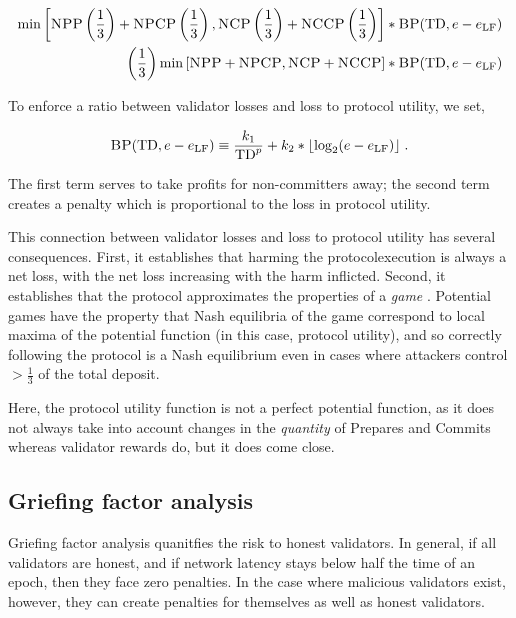\documentclass[12pt, final]{article}
\newcommand{\epoch}{\ensuremath{e}\xspace}
\newcommand{\BP}{\textsc{BP}\xspace}
\newcommand{\NCP}{\textsc{NCP}\xspace}
\newcommand{\NCCP}{\textsc{NCCP}\xspace}
\newcommand{\NPP}{\textsc{NPP}\xspace}
\newcommand{\NPCP}{\textsc{NPCP}\xspace}
\newcommand{\totaldeposit}{\textnormal{TD}\xspace}
\newcommand{\epochLF}{\ensuremath{\epoch_{\textnormal{LF}}}\xspace}
\begin{document}
\begin{equation}
\begin{split}
\min \left[ \NPP \left(\frac{1}{3}\right) + \NPCP\left(\frac{1}{3}\right), \NCP \left(\frac{1}{3}\right) + \NCCP\left(\frac{1}{3}\right) \right] &* \BP(\totaldeposit, \epoch - \epochLF) \\
\left(\frac{1}{3}\right) \min \left[ \NPP + \NPCP, \NCP + \NCCP \right] &* \BP(\totaldeposit, \epoch - \epochLF) \\
\end{split}
\end{equation}

To enforce a ratio between validator losses and loss to protocol utility, we set,

\begin{equation}
\BP(\totaldeposit, \epoch - \epochLF) \equiv \frac{k_1}{\totaldeposit^p} + k_2 * \lfloor \log_2(\epoch - \epochLF) \rfloor\; .
\end{equation}

The first term serves to take profits for non-committers away; the second term creates a penalty which is proportional to the loss in protocol utility.

This connection between validator losses and loss to protocol utility has several consequences. First, it establishes that harming the protocolexecution is always a net loss, with the net loss increasing with the harm inflicted. Second, it establishes that the protocol approximates the properties of a \emph{game} \cite{monderer1996potential}. Potential games have the property that Nash equilibria of the game correspond to local maxima of the potential function (in this case, protocol utility), and so correctly following the protocol is a Nash equilibrium even in cases where attackers control $>\frac{1}{3}$ of the total deposit.

Here, the protocol utility function is not a perfect potential function, as it does not always take into account changes in the \emph{quantity} of Prepares and Commits whereas validator rewards do, but it does come close. 

\subsection{Griefing factor analysis}
\label{sect:griefingfactor}
Griefing factor analysis quanitfies the risk to honest validators. In general, if all validators are honest, and if network latency stays below half  the time of an epoch, then they face zero penalties.  In the case where malicious validators exist, however, they can create penalties for themselves as well as honest validators.
\end{document}
